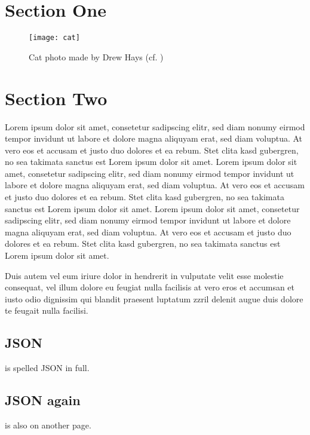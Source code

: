 \section{Section One}
\label{sec:section_one}

\begin{figure}[H]
    \centering
    \texttt{[image: cat]}
    \caption[Cat photo]{Cat photo made by Drew Hays (cf. \cite{Hays_2025})}
    \label{fig:cat}
\end{figure}

\section{Section Two}
\label{sec:section_two}

Lorem ipsum dolor sit amet, consetetur sadipscing elitr, sed diam nonumy eirmod tempor invidunt ut labore et dolore magna aliquyam erat, sed diam voluptua.
At vero eos et accusam et justo duo dolores et ea rebum.
Stet clita kasd gubergren, no sea takimata sanctus est Lorem ipsum dolor sit amet.
Lorem ipsum dolor sit amet, consetetur sadipscing elitr, sed diam nonumy eirmod tempor invidunt ut labore et dolore magna aliquyam erat, sed diam voluptua.
At vero eos et accusam et justo duo dolores et ea rebum.
Stet clita kasd gubergren, no sea takimata sanctus est Lorem ipsum dolor sit amet.
Lorem ipsum dolor sit amet, consetetur sadipscing elitr, sed diam nonumy eirmod tempor invidunt ut labore et dolore magna aliquyam erat, sed diam voluptua.
At vero eos et accusam et justo duo dolores et ea rebum.
Stet clita kasd gubergren, no sea takimata sanctus est Lorem ipsum dolor sit amet.

Duis autem vel eum iriure dolor in hendrerit in vulputate velit esse molestie consequat, vel illum dolore eu feugiat nulla facilisis at vero eros et accumsan et iusto odio dignissim qui blandit praesent luptatum zzril delenit augue duis dolore te feugait nulla facilisi.

\subsection{JSON}
\label{subsec:json}

 is spelled \acl{JSON} in full.

\pagebreak

\subsection{JSON again}
\label{subsec:json_again}

 is also on another page.